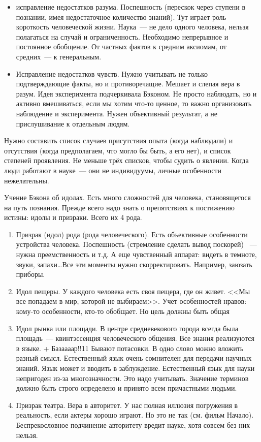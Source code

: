 \begin{itemize}
	\item исправление недостатков разума. Поспешность (перескок через ступени в познании, имея недостаточное количество знаний). Тут играет роль короткость человеческой жизни. Наука~--- не дело одного человека, нельзя полагаться на случай и ограниченность. Необходимо непрерывное и постоянное обобщение. От частных фактов к средним аксиомам, от средних~--- к генеральным.
	\item Исправление недостатков чувств. Нужно учитывать не только подтверждающие факты, но и противоречащие. Мешает и слепая вера в разум. Идея эксперимента подчеркивала Бэконом. Не просто наблюдать, но и активно вмешиваться, если мы хотим что-то ценное, то важно организовать наблюдение и эксперимента. Нужен объективный результат, а не прислушивание к отдельным людям.
\end{itemize}
Нужно составить список случаев присутствия опыта (когда наблюдали) и отсутствия (когда предполагаем, что могло бы быть, а его нет), и список степеней проявления. Не меньше трёх списков, чтобы судить о явлении. Когда люди работают в науке~--- они не индивидуумы, личные особенности нежелательны.

Учение Бэкона об идолах. Есть много сложностей для человека, становящегося на путь познания. Прежде всего надо знать о препятствиях к постижению истины: идолы и призраки. Всего их 4 рода.

\begin{enumerate}
	\item Призрак (идол) рода (рода человеческого). Есть объективные особенности устройства человека. Поспешность (стремление сделать вывод поскорей) ~--- нужна преемственность и т.д. А еще чувственный аппарат: видеть в темноте, звуки, запахи\ldots Все эти моменты нужно скорректировать. Например, заюзать приборы.
	\item Идол пещеры. У каждого человека есть своя пещера, где он живет. <<Мы все попадаем в мир, которой не выбираем>>. Учет особенностей нравов: кому-то особенности, кто-то обобщает. Но цель должны быть общая
	\item Идол рынка или площади. В центре средневекового города всегда была площадь~--- квинтэссенция человеческого общения. Все знания реализуются в языке. + Базаааар!!11 Бывают потасовки. В одно слово можно вложить разный смысл. Естественный язык очень сомнителен для передачи научных знаний. Язык может и вводить в заблуждение. Естественный язык для науки непригоден из-за многозначности. Это надо учитывать. Значение терминов должно быть строго определено и принято всем причастными людьми.
	\item Призрак театра. Вера в авторитет. У нас полная иллюзия погружения в реальность, если актеры хорошо играют. Но это не так (см. фильм Начало). Беспрекословное подчинение авторитету вредит науке, хотя совсем без них нельзя.
\end{enumerate}